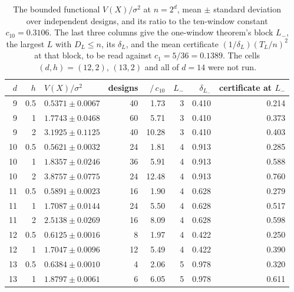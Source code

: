 \documentclass[11pt]{article}
\theoremstyle{definition}
\newcommand{\numCone}{0.1389}
\newcommand{\numCten}{0.3106}
\begin{document}
\begin{table}[t]
\centering\small
\caption{The bounded functional $V(X)/\sigma^2$ at $n=2^d$, mean $\pm$ standard deviation over
independent designs, and its ratio to the ten-window constant $c_{10}=\numCten$. The last three
columns give the one-window theorem's block $L_-$, the largest $L$ with $D_L\le n$, its $\delta_L$,
and the mean certificate $(1/\delta_L)(T_L/n)^2$ at that block, to be read against
$c_1=5/36=\numCone$. The cells $(d,h)=(12,2)$, $(13,2)$ and all of $d=14$ were not run.}
\label{tab:t3band}
\begin{tabular}{rrlrrrrr}
\toprule
$d$ & $h$ & $V(X)/\sigma^2$ & designs & $/\,c_{10}$ & $L_-$ & $\delta_{L_-}$ & certificate at $L_-$\\
\midrule
9 & 0.5 & $0.5371\pm0.0067$ & 40 & 1.73 & 3 & 0.410 & 0.214\\
9 & 1 & $1.7743\pm0.0468$ & 60 & 5.71 & 3 & 0.410 & 0.373\\
9 & 2 & $3.1925\pm0.1125$ & 40 & 10.28 & 3 & 0.410 & 0.403\\
10 & 0.5 & $0.5621\pm0.0032$ & 24 & 1.81 & 4 & 0.913 & 0.285\\
10 & 1 & $1.8357\pm0.0246$ & 36 & 5.91 & 4 & 0.913 & 0.588\\
10 & 2 & $3.8757\pm0.0775$ & 24 & 12.48 & 4 & 0.913 & 0.760\\
11 & 0.5 & $0.5891\pm0.0023$ & 16 & 1.90 & 4 & 0.628 & 0.279\\
11 & 1 & $1.7087\pm0.0144$ & 24 & 5.50 & 4 & 0.628 & 0.517\\
11 & 2 & $2.5138\pm0.0269$ & 16 & 8.09 & 4 & 0.628 & 0.598\\
12 & 0.5 & $0.6125\pm0.0016$ & 8 & 1.97 & 4 & 0.422 & 0.250\\
12 & 1 & $1.7047\pm0.0096$ & 12 & 5.49 & 4 & 0.422 & 0.390\\
13 & 0.5 & $0.6384\pm0.0010$ & 4 & 2.06 & 5 & 0.978 & 0.320\\
13 & 1 & $1.8797\pm0.0061$ & 6 & 6.05 & 5 & 0.978 & 0.611\\
\bottomrule
\end{tabular}
\end{table}
\end{document}
